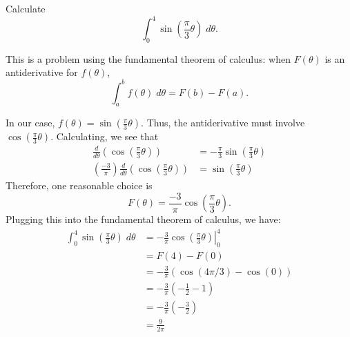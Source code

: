 \documentclass{ximera}
\author{Emma Smith Zbarsky}
\begin{document}
\begin{exercise}

Calculate \[\int_{0}^{4}\sin\left(\frac{\pi}{3}\theta\right)\;d\theta.\]


\begin{hint}
This is a problem using the fundamental theorem of calculus: when
$F(\theta)$ is an antiderivative for $f(\theta)$,
\[\int_a^b f(\theta)\; d\theta = F(b)-F(a).\]
\end{hint}


\begin{hint}
In our case, $f(\theta) = \sin\left(\frac{\pi}{3}\theta\right)$. Thus,
the antiderivative must involve $\cos\left(\frac{\pi}{3}\theta\right).$
Calculating, we see that \begin{align*}
\frac{d}{d\theta}\left(\cos\left(\frac{\pi}{3}\theta\right)\right) &= -\frac{\pi}{3}\sin\left(\frac{\pi}{3}\theta\right) \\
\left(\frac{-3}{\pi}\right)\frac{d}{d\theta}\left(\cos\left(\frac{\pi}{3}\theta\right)\right) &= \sin\left(\frac{\pi}{3}\theta\right) 
\end{align*} Therefore, one reasonable choice is
\[F(\theta) = \frac{-3}{\pi}\cos\left(\frac{\pi}{3}\theta\right).\]
Plugging this into the fundamental theorem of calculus, we have:
\begin{align*}
\int_{0}^{4}\sin\left(\frac{\pi}{3}\theta\right)\;d\theta &= \left.-\frac{3}{\pi}\cos\left(\frac{\pi}{3}\theta\right)\right|_0^4 \\
&= F(4)-F(0) \\
&= -\frac{3}{\pi}\left(\cos(4\pi/3)-\cos(0)\right) \\
&= -\frac{3}{\pi}\left(-\frac{1}{2}-1\right) \\
&= -\frac{3}{\pi}\left(-\frac{3}{2}\right) \\
&= \frac{9}{2\pi}
\end{align*}
\end{hint}


\begin{multipleChoice}
\end{multipleChoice}

\end{exercise}
\end{document}
